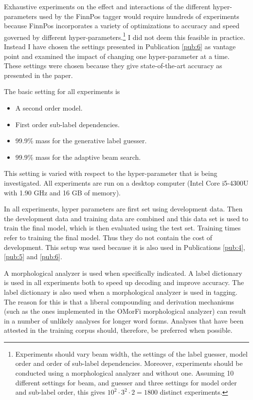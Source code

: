Exhaustive experiments on the effect and interactions of the different
hyper-parameters used by the FinnPos tagger would require hundreds of
experiments because FinnPos incorporates a variety of optimizations to
accuracy and speed governed by different
hyper-parameters.\footnote{Experiments should vary beam width, the
  settings of the label guesser, model order and order of sub-label
  dependencies. Moreover, experiments should be conducted using a
  morphological analyzer and without one. Assuming 10 different
  settings for beam, and guesser and three settings for model order
  and sub-label order, this gives $10^2\cdot 3^2 \cdot 2 = 1800$
  distinct experiments.} I did not deem this feasible in
practice. Instead I have chosen the settings presented in Publication
\ref{pub:6} as vantage point and examined the impact of changing one
hyper-parameter at a time. These settings were chosen because they
give state-of-the-art accuracy as presented in the paper.

The basic setting for all experiments is 
\begin{itemize}
\item A second order model.
\item First order sub-label dependencies.
\item 99.9\% mass for the generative label guesser.
\item 99.9\% mass for the adaptive beam search.
\end{itemize}
This setting is varied with respect to the hyper-parameter that is
being investigated. All experiments are run on a desktop computer
(Intel Core i5-4300U with 1.90 GHz and 16 GB of memory).

In all experiments, hyper parameters are first set using development
data. Then the development data and training data are combined and
this data set is used to train the final model, which is then
evaluated using the test set. Training times refer to training the
final model. Thus they do not contain the cost of development. This
setup was used because it is also used in Publications \ref{pub:4},
\ref{pub:5} and \ref{pub:6}.

A morphological analyzer is used when specifically indicated. A label
dictionary is used in all experiments both to speed up decoding and
improve accuracy. The label dictionary is also used when a
morphological analyzer is used in tagging. The reason for this is that
a liberal compounding and derivation mechanisms (such as the ones
implemented in the OMorFi morphological analyzer) can result in a
number of unlikely analyses for longer word forms. Analyses that have
been attested in the training corpus should, therefore, be preferred
when possible.

